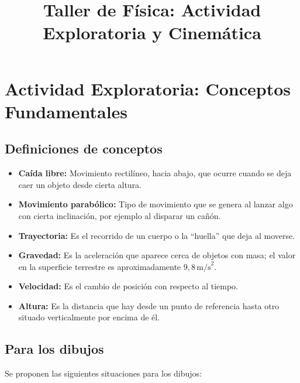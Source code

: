 \documentclass[11pt,a4paper]{article}
\title{\textbf{Taller de Física: Actividad Exploratoria y Cinemática}}
\author{\textbf{}}
\begin{document}
	
	\maketitle
	
	\section{Actividad Exploratoria: Conceptos Fundamentales}
	
	\subsection{Definiciones de conceptos}
	
	\begin{itemize}
		\item \textbf{Caída libre:} Movimiento rectilíneo, hacia abajo, que ocurre cuando se deja caer un objeto desde cierta altura.
		\item \textbf{Movimiento parabólico:} Tipo de movimiento que se genera al lanzar algo con cierta inclinación, por ejemplo al disparar un cañón.
		\item \textbf{Trayectoria:} Es el recorrido de un cuerpo o la ``huella'' que deja al moverse.
		\item \textbf{Gravedad:} Es la aceleración que aparece cerca de objetos con masa; el valor en la superficie terrestre es aproximadamente $9{,}8\,\text{m/s}^2$.
		\item \textbf{Velocidad:} Es el cambio de posición con respecto al tiempo.
		\item \textbf{Altura:} Es la distancia que hay desde un punto de referencia hasta otro situado verticalmente por encima de él.
	\end{itemize}
	
	\subsection{Para los dibujos}
	Se proponen las siguientes situaciones para los dibujos:
	
\end{document}
